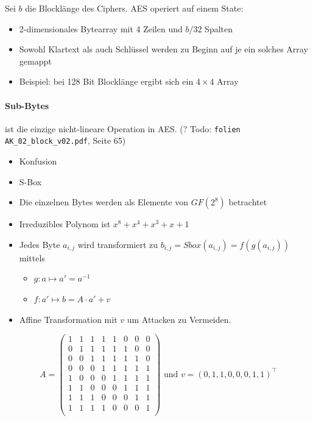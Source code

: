 Sei $b$ die Blocklänge des Ciphers. AES operiert auf einem State:
\begin{itemize}
    \item 2-dimensionales Bytearray mit 4 Zeilen und $b/32$ Spalten
    \item Sowohl Klartext als auch Schlüssel werden zu Beginn auf je ein solches Array gemappt
    \item Beispiel: bei 128 Bit Blocklänge ergibt sich ein $4 \times 4$ Array
\end{itemize}

\paragraph{Sub-Bytes} ist die einzige nicht-lineare Operation in AES. (? Todo: \verb|folien AK_02_block_v02.pdf|, Seite 65)

\begin{itemize}
    \item Konfusion
    \item S-Box 
    \item Die einzelnen Bytes werden als Elemente von $GF(2^8)$ betrachtet
    \item Irreduzibles Polynom ist $x^8 + x^4 + x^3 + x + 1$
    \item Jedes Byte $a_{i,j}$ wird transformiert zu $b_{i,j} = Sbox(a_{i, j}) = f(g(a_{i,j}))$ mittels 
    \begin{itemize}
        \item $g: a \mapsto a' = a^{-1}$
        \item $f: a' \mapsto b = A\cdot a' + v$
    \end{itemize}
    \item Affine Transformation mit $v$ um Attacken zu Vermeiden. 
\end{itemize}

\begin{equation*}
    A = \begin{pmatrix}
        1 & 1 & 1 & 1 & 1 & 0 & 0 & 0\\
        0 & 1 & 1 & 1 & 1 & 1 & 0 & 0\\
        0 & 0 & 1 & 1 & 1 & 1 & 1 & 0\\
        0 & 0 & 0 & 1 & 1 & 1 & 1 & 1\\
        1 & 0 & 0 & 0 & 1 & 1 & 1 & 1\\
        1 & 1 & 0 & 0 & 0 & 1 & 1 & 1\\
        1 & 1 & 1 & 0 & 0 & 0 & 1 & 1\\
        1 & 1 & 1 & 1 & 0 & 0 & 0 & 1\\
\end{pmatrix} \text{ und } v = (0,1,1,0,0,0,1,1)^\top
\end{equation*}

